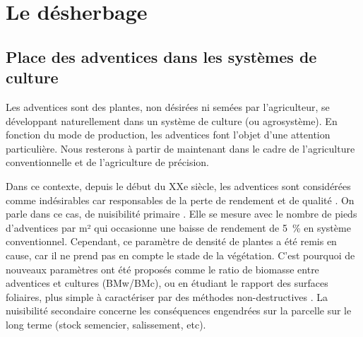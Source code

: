 \documentclass[../thesis.tex]{subfiles}
\begin{document}
    \newpage
    \section{Le désherbage}
    
    \subsection{Place des adventices dans les systèmes de culture}
    \label{sec:place-adventice}
    
    
    
    Les adventices sont des plantes, non désirées ni semées par l'agriculteur, se développant naturellement dans un système de culture (ou agrosystème). En fonction du mode de production, les adventices font l'objet d'une attention particulière. Nous resterons à partir de maintenant dans le cadre de l'agriculture conventionnelle et de l'agriculture de précision.
    
    \par Dans ce contexte, depuis le début du XXe siècle, les adventices sont considérées comme indésirables car responsables de la perte de rendement et de qualité \cite{cordeau2016nuisibilite}. On parle dans ce cas, de nuisibilité primaire \cite{caussanel:hal-00885190}. Elle se mesure avec le nombre de pieds d'adventices par m² qui occasionne une baisse de rendement de \SI{5}{\percent} en système conventionnel. Cependant, ce paramètre de densité de plantes a été remis en cause, car il ne prend pas en compte le stade de la végétation. C'est pourquoi de nouveaux paramètres ont été proposés comme le ratio de biomasse entre adventices et cultures (BMw/BMc), ou en étudiant le rapport des surfaces foliaires, plus simple à caractériser par des méthodes non-destructives \cite{Gee2021}. La nuisibilité secondaire concerne les conséquences engendrées sur la parcelle sur le long terme (stock semencier, salissement, etc).
    
\end{document}
